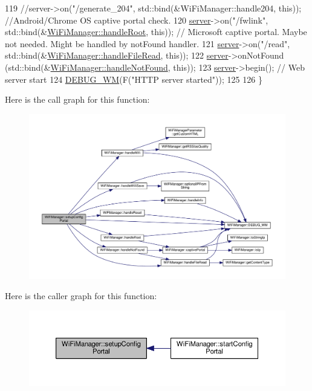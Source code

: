 \begin{DoxyCode}
119   \textcolor{comment}{//server->on("/generate\_204", std::bind(&WiFiManager::handle204, this));  //Android/Chrome OS captive
       portal check.}
120   \hyperlink{class_wi_fi_manager_a509523a01c0395cf0dc235b074f2a5ea}{server}->on(\textcolor{stringliteral}{"/fwlink"}, std::bind(&\hyperlink{class_wi_fi_manager_a47e4c7df7478f690c53ff9f5125c9760}{WiFiManager::handleRoot}, \textcolor{keyword}{this}));  \textcolor{comment}{//
      Microsoft captive portal. Maybe not needed. Might be handled by notFound handler.}
121   \hyperlink{class_wi_fi_manager_a509523a01c0395cf0dc235b074f2a5ea}{server}->on(\textcolor{stringliteral}{"/read"}, std::bind(&\hyperlink{class_wi_fi_manager_abed7fbbdab409fc8aba2a5c00f3d2db1}{WiFiManager::handleFileRead}, \textcolor{keyword}{this}));
122   \hyperlink{class_wi_fi_manager_a509523a01c0395cf0dc235b074f2a5ea}{server}->onNotFound (std::bind(&\hyperlink{class_wi_fi_manager_a7d01f7de3e4b76acdabffac79fa3d0ab}{WiFiManager::handleNotFound}, \textcolor{keyword}{this}));
123   \hyperlink{class_wi_fi_manager_a509523a01c0395cf0dc235b074f2a5ea}{server}->begin(); \textcolor{comment}{// Web server start}
124   \hyperlink{class_wi_fi_manager_ae5f595c670ccbcf9a191baf50f5c7c26}{DEBUG\_WM}(F(\textcolor{stringliteral}{"HTTP server started"}));
125 
126 \}
\end{DoxyCode}
Here is the call graph for this function\+:\nopagebreak
\begin{figure}[H]
\begin{center}
\leavevmode
\includegraphics[width=350pt]{d4/dc8/class_wi_fi_manager_a1743325d0dd86d011df96b22d2a0ddd6_cgraph}
\end{center}
\end{figure}
Here is the caller graph for this function\+:\nopagebreak
\begin{figure}[H]
\begin{center}
\leavevmode
\includegraphics[width=350pt]{d4/dc8/class_wi_fi_manager_a1743325d0dd86d011df96b22d2a0ddd6_icgraph}
\end{center}
\end{figure}
